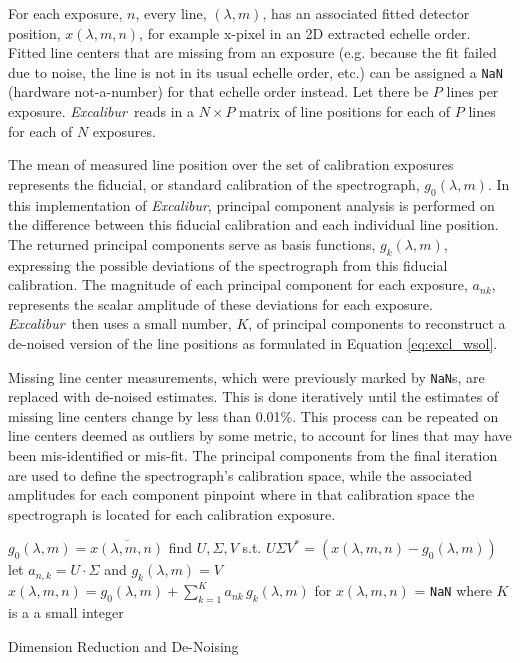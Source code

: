 \documentclass[modern]{aastex63}
\newcommand{\project}[1]{\textsl{#1}}
\newcommand{\name}{\project{Excalibur}}
\newcommand{\code}[1]{\texttt{#1}}
\begin{document}
For each exposure, $n$, every line, $(\lambda,m)$, has an associated fitted detector position, $x(\lambda,m,n)$, for example x-pixel in an 2D extracted echelle order.  Fitted line centers that are missing from an exposure (e.g. because the fit failed due to noise, the line is not in its usual echelle order, etc.) can be assigned a \code{NaN} (hardware not-a-number) for that echelle order instead.  Let there be $P$ lines per exposure.  \name\ reads in a $N \times P$ matrix of line positions for each of $P$ lines for each of $N$ exposures.

The mean of measured line position over the set of calibration exposures represents the fiducial, or standard calibration of the spectrograph, $g_0(\lambda,m)$.  In this implementation of \name, principal component analysis is performed on the difference between this fiducial calibration and each individual line position.  The returned principal components serve as basis functions,  $g_k(\lambda,m)$, expressing the possible deviations of the spectrograph from this fiducial calibration.  The magnitude of each principal component for each exposure, $a_{nk}$, represents the scalar amplitude of these deviations for each exposure.  \name\ then uses a small number, $K$, of principal components to reconstruct a de-noised version of the line positions as formulated in Equation \ref{eq:excl_wsol}.

Missing line center measurements, which were previously marked by \code{NaN}s, are replaced with de-noised estimates.  This is done iteratively until the estimates of missing line centers change by less than 0.01\%.  This process can be repeated on line centers deemed as outliers by some metric, to account for lines that may have been mis-identified or mis-fit.  The principal components from the final iteration are used to define the spectrograph's calibration space, while the associated amplitudes for each component pinpoint where in that calibration space the spectrograph is located for each calibration exposure.

\begin{algorithm}
\SetAlgoLined
{}
{
	$g_0(\lambda,m) = \overline{x(\lambda,m,n)}$\;
	find $U, \Sigma, V$ s.t. $U\Sigma V^* = (x(\lambda,m,n)-g_0(\lambda,m))$\;
	let $a_{n,k} = U\cdot \Sigma$ and $g_k(\lambda,m) = V$\;
	$x(\lambda,m,n) = g_0(\lambda,m) + \sum_{k=1}^K a_{nk}\,g_k(\lambda,m)$ for $x(\lambda,m,n)$ = \code{NaN} where $K$ is a a small integer
	}
\caption{Dimension Reduction and De-Noising}
\end{algorithm}
\end{document}
